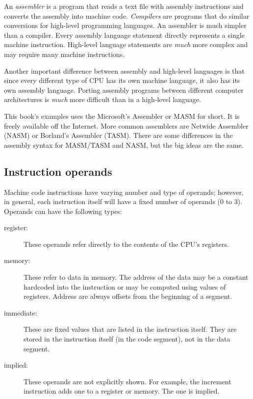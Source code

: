 An \emph{assembler}  is a program that reads a text
file with assembly instructions and converts the assembly into machine
code.  \emph{Compilers}  are programs that do similar
conversions for high-level programming languages. An assembler is much
simpler than a compiler.  Every
assembly language statement directly represents a single machine
instruction. High-level language statements are \emph{much} more
complex and may require many machine instructions.

Another important difference between assembly and high-level languages is that
since every different type of CPU has its own machine language, it also has
its own assembly language. Porting assembly programs between different computer
architectures is \emph{much} more difficult than in a high-level language.

This book's examples uses the Microsoft's Assembler or MASM 
for short. It is freely available off the Internet. More common assemblers are Netwide Assembler (NASM)
 or Borland's Assembler (TASM).  There are
some differences in the assembly syntax for MASM/TASM and NASM, but the
big ideas are the same.

\subsection{Instruction operands}

Machine code instructions have varying number and type of operands; however,
in general, each instruction itself will have a fixed number of operands (0
to 3). Operands can have the following types:
\begin{description}
\item[register:]
These operands refer directly to the contents of the CPU's registers.
\item[memory:]
These refer to data in memory. The address of the data may be a constant
hardcoded into the instruction or may be computed using values of registers.
Address are always offsets from the beginning of a segment.
\item[immediate:]
These are fixed values that are listed in the instruction itself. They are
stored in the instruction itself (in the code segment), not in the data
segment.
\item[implied:]
These operands are not explicitly shown. For example, the increment
instruction adds one to a register or memory. The one is implied.
\end{description}

